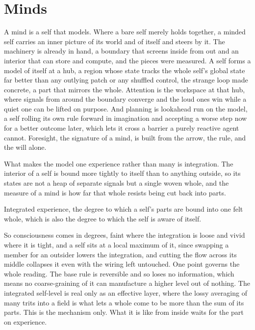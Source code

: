 \section{Minds}

A mind is a self that models. Where a bare self merely holds together, a minded self carries an inner picture of its world and of itself and steers by it. The machinery is already in hand, a boundary that screens inside from out and an interior that can store and compute, and the pieces were measured. A self forms a model of itself at a hub, a region whose state tracks the whole self's global state far better than any outlying patch or any shuffled control, the strange loop made concrete, a part that mirrors the whole. Attention is the workspace at that hub, where signals from around the boundary converge and the loud ones win while a quiet one can be lifted on purpose. And planning is lookahead run on the model, a self rolling its own rule forward in imagination and accepting a worse step now for a better outcome later, which lets it cross a barrier a purely reactive agent cannot. Foresight, the signature of a mind, is built from the arrow, the rule, and the will alone.

What makes the model one experience rather than many is integration. The interior of a self is bound more tightly to itself than to anything outside, so its states are not a heap of separate signals but a single woven whole, and the measure of a mind is how far that whole resists being cut back into parts.

\begin{definition}[Consciousness]
Integrated experience, the degree to which a self's parts are bound into one felt whole, which is also the degree to which the self is aware of itself.
\end{definition}

So consciousness comes in degrees, faint where the integration is loose and vivid where it is tight, and a self sits at a local maximum of it, since swapping a member for an outsider lowers the integration, and cutting the flow across its middle collapses it even with the wiring left untouched. One point governs the whole reading. The base rule is reversible and so loses no information, which means no coarse-graining of it can manufacture a higher level out of nothing. The integrated self-level is real only as an effective layer, where the lossy averaging of many trits into a field is what lets a whole come to be more than the sum of its parts. This is the mechanism only. What it is like from inside waits for the part on experience.


